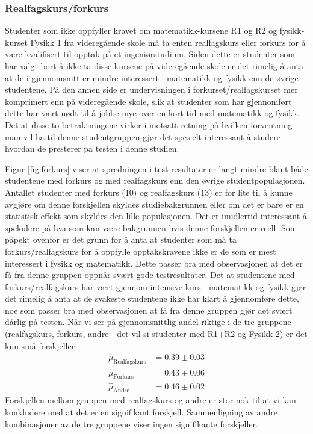 \documentclass[a4paper,norsk,12pt]{article}
\begin{document}
\subsubsection{Realfagskurs/forkurs}
Studenter som ikke oppfyller kravet om matematikk-kursene R1 og R2 og fysikk-kurset Fysikk 1 fra videregående skole må ta enten realfagskurs eller forkurs for å være kvalifisert til opptak på et ingeniørstudium. Siden dette er studenter som har valgt bort å ikke ta disse kursene på videregående skole er det rimelig å anta at de i gjennomsnitt er mindre interessert i matematikk og fysikk enn de øvrige studentene. På den annen side er undervisningen i forkurset/realfagskurset mer komprimert enn på videregående skole, slik at studenter som har gjennomført dette har vært nødt til å jobbe mye over en kort tid med matematikk og fysikk. Det at disse to betraktningene virker i motsatt retning på hvilken forventning man vil ha til denne studentgruppen gjør det spesielt interessant å studere hvordan de presterer på testen i denne studien.

Figur \ref{fig:forkurs} viser at spredningen i test-resultater er langt mindre blant både studentene med forkurs og med realfagskurs enn den øvrige studentpopulasjonen. Antallet studenter med forkurs (10) og realfagskurs (13) er for lite til å kunne avgjøre om denne forskjellen skyldes studiebakgrunnen eller om det er bare er en statistisk effekt som skyldes den lille populasjonen. Det er imidlertid interessant å spekulere på hva som kan være bakgrunnen hvis denne forskjellen er reell. Som påpekt ovenfor er det grunn for å anta at studenter som må ta forkurs/realfagskurs for å oppfylle opptakskravene ikke er de som er mest interessert i fysikk og matematikk. Dette passer bra med observasjonen at det er få fra denne gruppen oppnår svært gode testresultater. Det at studentene med forkurs/realfagskurs har vært gjennom intensive kurs i matematikk og fysikk gjør det rimelig å anta at de svakeste studentene ikke har klart å gjennomføre dette, noe som passer bra med observasjonen at få fra denne gruppen gjør det svært dårlig på testen. Når vi ser på gjennomsnittlig andel riktige i de tre gruppene (realfagskurs, forkurs, andre---det vil si studenter med R1+R2 og Fysikk 2) er det kun små forskjeller:
\begin{displaymath}
\begin{aligned}
	\hat{\mu}_\text{Realfagskurs} &= 0.39\pm 0.03 \\
	\hat{\mu}_\text{Forkurs} &= 0.43\pm0.06 \\
	\hat{\mu}_\text{Andre} &= 0.46\pm 0.02
\end{aligned}
\end{displaymath}
Forskjellen mellom gruppen med realfagskurs og andre er stor nok til at vi kan konkludere med at det er en signifikant forskjell. Sammenligning av andre kombinasjoner av de tre gruppene viser ingen signifikante forskjeller.
\end{document}
